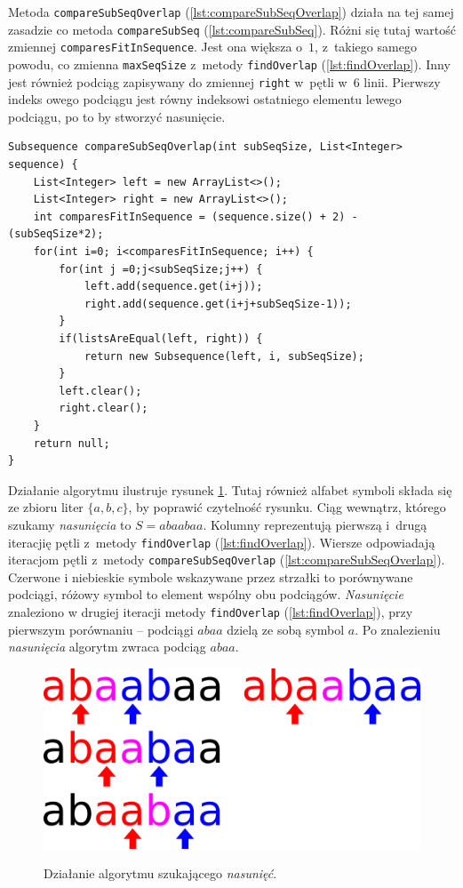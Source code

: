 \documentclass[document]{xmgr}
\begin{document}
Metoda \texttt{compareSubSeqOverlap} (\ref{lst:compareSubSeqOverlap}) działa na tej samej zasadzie co metoda \texttt{compareSubSeq} (\ref{lst:compareSubSeq}). Różni się tutaj wartość zmiennej \texttt{comparesFitInSequence}. Jest ona większa o~$1$, z~takiego samego powodu, co zmienna \texttt{max\-SeqSize} z~metody \texttt{findOverlap} (\ref{lst:findOverlap}). Inny jest również podciąg zapisywany do zmiennej \mbox{\texttt{right}} w~pętli w~6 linii. Pierwszy indeks owego podciągu jest równy indeksowi ostatniego elementu lewego podciągu, po to by stworzyć nasunięcie.
\newpage
\begin{lstlisting}[caption={Metoda pomocnicza przy szukaniu \emph{nasunięć} wewnątrz listy.},label=lst:compareSubSeqOverlap]
Subsequence compareSubSeqOverlap(int subSeqSize, List<Integer> sequence) {
	List<Integer> left = new ArrayList<>();
	List<Integer> right = new ArrayList<>();
	int comparesFitInSequence = (sequence.size() + 2) - (subSeqSize*2);
	for(int i=0; i<comparesFitInSequence; i++) {
		for(int j =0;j<subSeqSize;j++) {
			left.add(sequence.get(i+j));
			right.add(sequence.get(i+j+subSeqSize-1));
		}
		if(listsAreEqual(left, right)) {
			return new Subsequence(left, i, subSeqSize);
		}
		left.clear();
		right.clear();
	}
	return null;
} 
\end{lstlisting}

Działanie algorytmu ilustruje rysunek \ref{fig:overlapFinding}. Tutaj również alfabet symboli składa się ze zbioru liter $\{a, b, c\}$, by poprawić czytelność rysunku. Ciąg wewnątrz, którego szukamy \emph{nasunięcia} to $S=abaabaa$. Kolumny reprezentują pierwszą i~drugą iteracjię pętli z~metody \texttt{findOverlap} (\ref{lst:findOverlap}). Wiersze odpowiadają iteracjom pętli z~metody \texttt{compareSubSeqOverlap} (\ref{lst:compareSubSeqOverlap}). Czerwone i niebieskie symbole wskazywane przez strzałki to porównywane podciągi, różowy symbol to element wspólny obu podciągów. \emph{Nasunięcie} znaleziono w drugiej iteracji metody \texttt{findOverlap} (\ref{lst:findOverlap}), przy pierwszym porównaniu -- podciągi $abaa$ dzielą ze sobą symbol $a$. Po znalezieniu \emph{nasunięcia} algorytm zwraca podciąg $abaa$.

\begin{figure}[tbh]
    \centering
    \caption{Działanie algorytmu szukającego \emph{nasunięć}.}
    \includegraphics[width = \textwidth]{images/overlapFinding}
    \label{fig:overlapFinding}
\end{figure}
\end{document}

